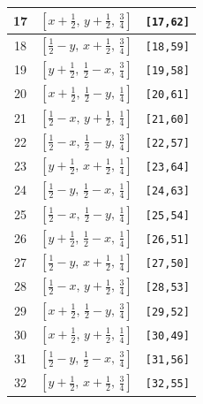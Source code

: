 \documentclass[fleqn,8pt]{jsarticle}
\begin{document}
\begin{longtable}{ccc}
17 & $\left[ x + \frac{1}{2},\, y + \frac{1}{2},\, \frac{3}{4} \right]$ & {\tt [17,62]} \\ \hline
18 & $\left[ \frac{1}{2} - y,\, x + \frac{1}{2},\, \frac{3}{4} \right]$ & {\tt [18,59]} \\ \hline
19 & $\left[ y + \frac{1}{2},\, \frac{1}{2} - x,\, \frac{3}{4} \right]$ & {\tt [19,58]} \\ \hline
20 & $\left[ x + \frac{1}{2},\, \frac{1}{2} - y,\, \frac{1}{4} \right]$ & {\tt [20,61]} \\ \hline
21 & $\left[ \frac{1}{2} - x,\, y + \frac{1}{2},\, \frac{1}{4} \right]$ & {\tt [21,60]} \\ \hline
22 & $\left[ \frac{1}{2} - x,\, \frac{1}{2} - y,\, \frac{3}{4} \right]$ & {\tt [22,57]} \\ \hline
23 & $\left[ y + \frac{1}{2},\, x + \frac{1}{2},\, \frac{1}{4} \right]$ & {\tt [23,64]} \\ \hline
24 & $\left[ \frac{1}{2} - y,\, \frac{1}{2} - x,\, \frac{1}{4} \right]$ & {\tt [24,63]} \\ \hline
25 & $\left[ \frac{1}{2} - x,\, \frac{1}{2} - y,\, \frac{1}{4} \right]$ & {\tt [25,54]} \\ \hline
26 & $\left[ y + \frac{1}{2},\, \frac{1}{2} - x,\, \frac{1}{4} \right]$ & {\tt [26,51]} \\ \hline
27 & $\left[ \frac{1}{2} - y,\, x + \frac{1}{2},\, \frac{1}{4} \right]$ & {\tt [27,50]} \\ \hline
28 & $\left[ \frac{1}{2} - x,\, y + \frac{1}{2},\, \frac{3}{4} \right]$ & {\tt [28,53]} \\ \hline
29 & $\left[ x + \frac{1}{2},\, \frac{1}{2} - y,\, \frac{3}{4} \right]$ & {\tt [29,52]} \\ \hline
30 & $\left[ x + \frac{1}{2},\, y + \frac{1}{2},\, \frac{1}{4} \right]$ & {\tt [30,49]} \\ \hline
31 & $\left[ \frac{1}{2} - y,\, \frac{1}{2} - x,\, \frac{3}{4} \right]$ & {\tt [31,56]} \\ \hline
32 & $\left[ y + \frac{1}{2},\, x + \frac{1}{2},\, \frac{3}{4} \right]$ & {\tt [32,55]} \\
\end{longtable}
\renewcommand{\arraystretch}{1.2}
\end{document}
